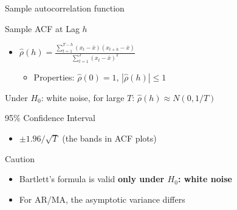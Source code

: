 \documentclass[9pt, aspectratio=169, t]{beamer}
\begin{document}
\begin{frame}{Sample autocorrelation function}
    \vspace{-0.2cm}
    {\small
    \begin{block}{Sample ACF at Lag $h$}
        \begin{itemize}\setlength{\itemsep}{0pt}
            \item $\hat{\rho}(h) = \frac{\sum_{t=1}^{T-h}(x_t - \bar{x})(x_{t+h} - \bar{x})}{\sum_{t=1}^{T}(x_t - \bar{x})^2}$
            \begin{itemize}
                \item Properties: $\hat{\rho}(0) = 1$, $|\hat{\rho}(h)| \leq 1$
            \end{itemize}
        \end{itemize}
    \end{block}

    \begin{thm}[Bartlett, 1946]
        Under $H_0$: white noise, for large $T$: $\hat{\rho}(h) \approx N(0, 1/T)$
    \end{thm}

    \begin{block}{95\% Confidence Interval}
    \begin{itemize}\setlength{\itemsep}{0pt}
        \item $\pm 1.96/\sqrt{T}$ (the bands in ACF plots)
    \end{itemize}
    \end{block}

    \begin{alertblock}{Caution}
        \begin{itemize}\setlength{\itemsep}{0pt}
            \item Bartlett's formula is valid \textbf{only under $H_0$: white noise}
            \item For AR/MA, the asymptotic variance differs
        \end{itemize}
    \end{alertblock}
    }
\end{frame}
\end{document}
